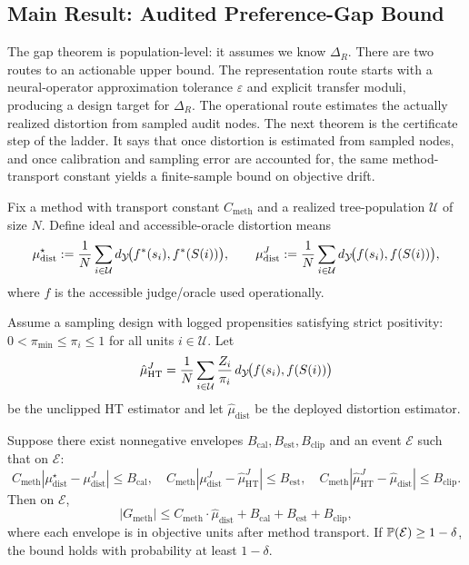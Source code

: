 \subsection{Main Result: Audited Preference-Gap Bound}

The gap theorem is population-level: it assumes we know $\Delta_R$. There are two routes to an actionable upper bound. The representation route starts with a neural-operator approximation tolerance $\varepsilon$ and explicit transfer moduli, producing a design target for $\Delta_R$. The operational route estimates the actually realized distortion from sampled audit nodes. The next theorem is the certificate step of the ladder. It says that once distortion is estimated from sampled nodes, and once calibration and sampling error are accounted for, the same method-transport constant yields a finite-sample bound on objective drift.

\begin{theorem}\label{thm:e2e}
Fix a method with transport constant $C_{\mathrm{meth}}$ and a realized tree-population $\mathcal{U}$ of size $N$. Define ideal and accessible-oracle distortion means
\[
\mu_{\mathrm{dist}}^{\star}:=\frac{1}{N}\sum_{i\in\mathcal{U}} d_{\mathcal{Y}}\!\big(f^\ast(s_i),f^\ast(S(i))\big),\qquad
\mu_{\mathrm{dist}}^{J}:=\frac{1}{N}\sum_{i\in\mathcal{U}} d_{\mathcal{Y}}\!\big(f(s_i),f(S(i))\big),
\]
where $f$ is the accessible judge/oracle used operationally.

Assume a sampling design with logged propensities satisfying strict positivity: $0 < \pi_{\min} \le \pi_i \le 1$ for all units $i \in \mathcal{U}$. Let
\[
\hat{\mu}_{\mathrm{HT}}^{J}=\frac{1}{N}\sum_{i\in\mathcal{U}}\frac{Z_i}{\pi_i}\,d_{\mathcal{Y}}\!\big(f(s_i),f(S(i))\big)
\]
be the unclipped HT estimator and let $\hat{\mu}_{\mathrm{dist}}$ be the deployed distortion estimator.

Suppose there exist nonnegative envelopes $B_{\mathrm{cal}}, B_{\mathrm{est}}, B_{\mathrm{clip}}$ and an event $\mathcal{E}$ such that on $\mathcal{E}$:
\[
C_{\mathrm{meth}}\!\left|\mu_{\mathrm{dist}}^{\star}-\mu_{\mathrm{dist}}^{J}\right|\le B_{\mathrm{cal}},\quad
C_{\mathrm{meth}}\!\left|\mu_{\mathrm{dist}}^{J}-\hat{\mu}_{\mathrm{HT}}^{J}\right|\le B_{\mathrm{est}},\quad
C_{\mathrm{meth}}\!\left|\hat{\mu}_{\mathrm{HT}}^{J}-\hat{\mu}_{\mathrm{dist}}\right|\le B_{\mathrm{clip}}.
\]
Then on $\mathcal{E}$,
\[
|G_{\mathrm{meth}}| \le C_{\mathrm{meth}} \cdot \hat{\mu}_{\mathrm{dist}} + B_{\mathrm{cal}} + B_{\mathrm{est}} + B_{\mathrm{clip}},
\]
where each envelope is in objective units after method transport. If $\mathbb{P}(\mathcal{E})\ge 1-\delta$, the bound holds with probability at least $1-\delta$.
\end{theorem}

